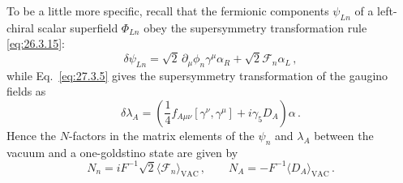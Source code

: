 To be a little more specific, recall that the fermionic components
\(\psi_{Ln}\) of a left-chiral scalar superfield \(\Phi_{Ln}\) obey the
supersymmetry transformation rule \eqref{eq:26.3.15}:
\begin{equation}
  \delta\psi_{Ln}
  =\sqrt{2}\,\partial_\mu\phi_n\gamma^\mu\alpha_R
  +\sqrt{2}\mathcal{F}_n\alpha_L\,,
  \tag{29.2.30}\label{eq:29.2.30}
\end{equation}
while Eq.~\eqref{eq:27.3.5} gives the supersymmetry transformation of the
gaugino fields as
\begin{equation}
  \delta\lambda_A
  =
  \left(
    \frac14f_{A\mu\nu}[\gamma^\nu,\gamma^\mu]
    +i\gamma_5D_A
  \right)\alpha\,.
  \tag{29.2.31}\label{eq:29.2.31}
\end{equation}
Hence the \(N\)-factors in the matrix elements of the \(\psi_n\) and
\(\lambda_A\) between the vacuum and a one-goldstino state are given by
\begin{equation}
  N_n
  =iF^{-1}\sqrt{2}
    \langle\mathcal{F}_n\rangle_{\mathrm{VAC}}\,,
  \qquad
  N_A
  =-F^{-1}\langle D_A\rangle_{\mathrm{VAC}}\,.
  \tag{29.2.32}\label{eq:29.2.32}
\end{equation}

